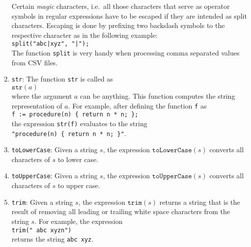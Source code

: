 \begin{enumerate}
      Certain \emph{magic} characters, i.e.~all those characters that serve as operator
      symbols in regular expressions have to be escaped if they are intended as split
      characters.  Escaping is done by prefixing two backslash symbols to the respective 
      character as in the following example:
      \\[0.2cm]
      \hspace*{1.3cm}
      \texttt{split("abc|xyz", "|");}
      \\[0.2cm]
      The function \texttt{split} is very handy when processing comma separated values from
      \textsc{CSV} files.
\item \texttt{str}:  The function \texttt{str} is called as
      \\[0.2cm]
      \hspace*{1.3cm}
      $\texttt{str}(a)$
      \\[0.2cm]
      where the argument $a$ can be anything.  This function computes the string
      representation of $a$.  For example, after defining the function \texttt{f} as
      \\[0.2cm]
      \hspace*{1.3cm}
      \texttt{f := procedure(n) \{ return n * n; \};}
      \\[0.2cm]
      the expression \texttt{str(f)} evaluates to the string
      \\[0.2cm]
      \hspace*{1.3cm}
      \texttt{"procedure(n) \{ return n * n; \}"}.      
\item \texttt{toLowerCase}:  Given a string $s$, the expression $\texttt{toLowerCase}(s)$
      converts all characters of $s$ to lower case.
\item \texttt{toUpperCase}:  Given a string $s$, the expression $\texttt{toUpperCase}(s)$
      converts all characters of $s$ to upper case.
\item \texttt{trim}:  Given a string $s$, the expression $\mathtt{trim}(s)$ returns a
      string that is the result of removing all leading or trailing white space characters from the
      string $s$.  For example, the expression
      \\[0.2cm]
      \hspace*{1.3cm}
      \texttt{trim("  abc xyzn")}
      \\[0.2cm]
      returns the string \texttt{abc xyz}.
\end{enumerate}

